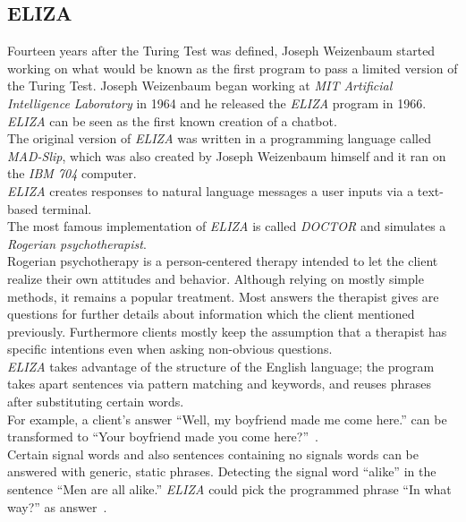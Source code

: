 \subsection{ELIZA}
\label{eliza}

Fourteen years after the Turing Test was defined, Joseph Weizenbaum started working on what would be known as the first program to pass a limited version of the Turing Test.
Joseph Weizenbaum began working at \emph{MIT Artificial Intelligence Laboratory} in 1964 and he released the \emph{ELIZA} program in 1966.
\\
\emph{ELIZA} can be seen as the first known creation of a chatbot.
\\

The original version of \emph{ELIZA} was written in a programming language called \emph{MAD-Slip},
which was also created by Joseph Weizenbaum himself and it ran on the \emph{IBM 704} computer.
\\
\emph{ELIZA} creates responses to natural language messages a user inputs via a text-based terminal.
\\

The most famous implementation of \emph{ELIZA} is called \emph{DOCTOR} and simulates a \emph{Rogerian psychotherapist}.
\\
Rogerian psychotherapy is a person-centered therapy intended to let the client realize their own attitudes and behavior.
Although relying on mostly simple methods, it remains a popular treatment.
Most answers the therapist gives are questions for further details about information which the client mentioned previously.
Furthermore clients mostly keep the assumption that a therapist has specific intentions even when asking non-obvious questions.
\\

\emph{ELIZA} takes advantage of the structure of the English language;
the program takes apart sentences via pattern matching and keywords, and reuses phrases after substituting certain words.
\\
For example, a client's answer ``Well, my boyfriend made me come here.'' can be transformed to ``Your boyfriend made you come here?''~\cite{elizatest}.
\\
Certain signal words and also sentences containing no signals words can be answered with generic, static phrases.
Detecting the signal word ``alike'' in the sentence ``Men are all alike.'' \emph{ELIZA} could pick the programmed phrase ``In what way?'' as answer~\cite{elizatest}.
\\

